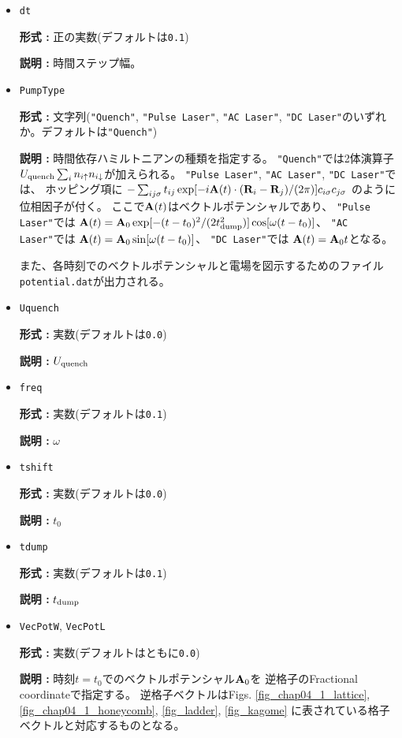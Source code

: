 \begin{itemize}

\item \verb|dt|
  
  {\bf 形式 :} 正の実数(デフォルトは\verb|0.1|)
  
  {\bf 説明 :} 時間ステップ幅。

\item \verb|PumpType|
  
  {\bf 形式 :} 文字列(\verb|"Quench"|, \verb|"Pulse Laser"|, \verb|"AC Laser"|,  
  \verb|"DC Laser"|のいずれか。デフォルトは\verb|"Quench"|)

  {\bf 説明 :} 時間依存ハミルトニアンの種類を指定する。
  \verb|"Quench"|では2体演算子
  $U_{\rm quench} \sum_i n_{i \uparrow} n_{i \downarrow}$が加えられる。
  \verb|"Pulse Laser"|, \verb|"AC Laser"|, \verb|"DC Laser"|では、
  ホッピング項に
  $-\sum_{i j \sigma} t_{i j} \exp[-i{\bf A}(t) \cdot ({\bf R}_i-{\bf R}_j)/(2\pi)] c_{i \sigma} c_{j \sigma}$
  のように位相因子が付く。
  ここで${\bf A}(t)$はベクトルポテンシャルであり、
  \verb|"Pulse Laser"|では
  ${\bf A}(t) = {\bf A}_0 \exp[-(t-t_0)^2/(2 t_{\rm dump}^2)] \cos[\omega (t-t_0)]$、
  \verb|"AC Laser"|では
  ${\bf A}(t) = {\bf A}_0 \sin[\omega (t-t_0)]$、
  \verb|"DC Laser"|では
  ${\bf A}(t) = {\bf A}_0 t$となる。

  また、各時刻でのベクトルポテンシャルと電場を図示するためのファイル
  \verb|potential.dat|が出力される。
  
\item \verb|Uquench|
  
  {\bf 形式 :} 実数(デフォルトは\verb|0.0|)
  
  {\bf 説明 :} $U_{\rm quench}$

\item \verb|freq|
  
  {\bf 形式 :} 実数(デフォルトは\verb|0.1|)
  
  {\bf 説明 :} $\omega$

\item \verb|tshift|
  
  {\bf 形式 :} 実数(デフォルトは\verb|0.0|)
  
  {\bf 説明 :} $t_0$

\item \verb|tdump|
  
  {\bf 形式 :} 実数(デフォルトは\verb|0.1|)
  
  {\bf 説明 :} $t_{\rm dump}$

\item \verb|VecPotW|, \verb|VecPotL|
  
  {\bf 形式 :} 実数(デフォルトはともに\verb|0.0|)

  {\bf 説明 :} 時刻$t=t_0$でのベクトルポテンシャル${\bf A}_0$を
  逆格子のFractional coordinateで指定する。
  逆格子ベクトルはFigs.
  \ref{fig_chap04_1_lattice}, \ref{fig_chap04_1_honeycomb},
  \ref{fig_ladder}, \ref{fig_kagome}
  に表されている格子ベクトルと対応するものとなる。

\end{itemize}

